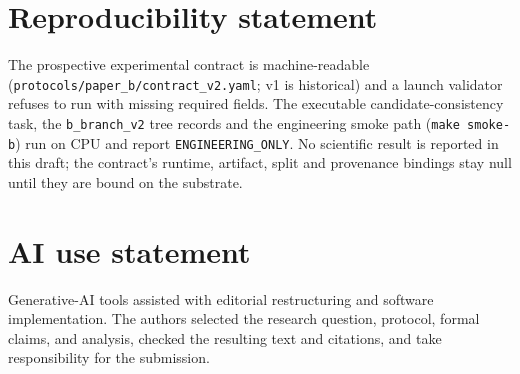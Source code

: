 \documentclass{article}
\theoremstyle{plain}
\theoremstyle{definition}
\theoremstyle{remark}
\begin{document}

\makeatletter
\renewcommand{\Notice@String}{Research draft: results are planned; no experimental claims.}
\makeatother

\printAffiliationsAndNotice{}

\begin{abstract}

\end{abstract}
















\section*{Reproducibility statement}
The prospective experimental contract is machine-readable
(\texttt{protocols/paper\_b/contract\_v2.yaml}; v1 is historical) and a launch
validator refuses to run with missing required fields.  The executable
candidate-consistency task, the \texttt{b\_branch\_v2} tree records and the
engineering smoke path (\texttt{make smoke-b}) run on CPU and report
\texttt{ENGINEERING\_ONLY}.  No scientific result is reported in this draft; the
contract's runtime, artifact, split and provenance bindings stay null until they
are bound on the substrate.

\section*{AI use statement}
Generative-AI tools assisted with editorial restructuring and software
implementation.  The authors selected the research question, protocol, formal
claims, and analysis, checked the resulting text and citations, and take
responsibility for the submission.




\newpage
\onecolumn
\appendix

\end{document}
